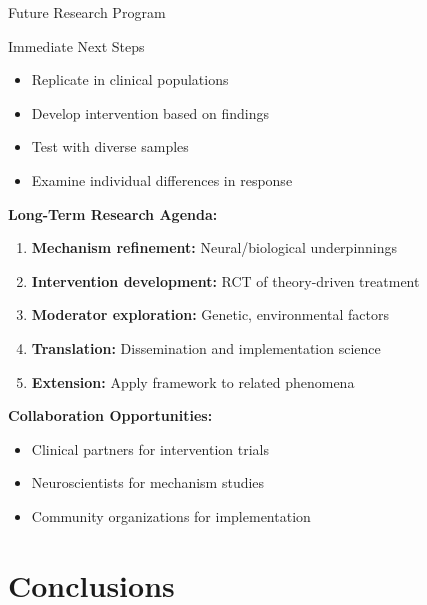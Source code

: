 \documentclass[aspectratio=169,12pt]{beamer}
\begin{document}
\begin{frame}{Future Research Program}
  \begin{block}{Immediate Next Steps}
    \begin{itemize}
      \item Replicate in clinical populations
      \item Develop intervention based on findings
      \item Test with diverse samples
      \item Examine individual differences in response
    \end{itemize}
  \end{block}
  
  \vspace{0.5cm}
  
  \textbf{Long-Term Research Agenda:}
  \begin{enumerate}
    \item \textbf{Mechanism refinement:} Neural/biological underpinnings
    \item \textbf{Intervention development:} RCT of theory-driven treatment
    \item \textbf{Moderator exploration:} Genetic, environmental factors
    \item \textbf{Translation:} Dissemination and implementation science
    \item \textbf{Extension:} Apply framework to related phenomena
  \end{enumerate}
  
  \vspace{0.5cm}
  
  \textbf{Collaboration Opportunities:}
  \begin{itemize}
    \item Clinical partners for intervention trials
    \item Neuroscientists for mechanism studies
    \item Community organizations for implementation
  \end{itemize}
\end{frame}


\section{Conclusions}
\end{document}
